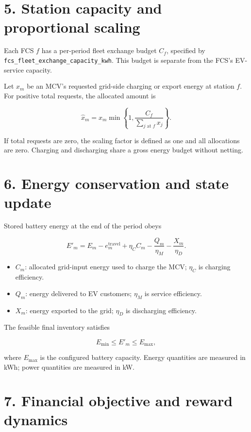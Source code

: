 \documentclass[11pt,letterpaper]{article}
\begin{document}
\section*{5. Station capacity and proportional scaling}


Each FCS $f$ has a per-period fleet exchange budget $C_f$, specified by \texttt{fcs\_fleet\_exchange\_capacity\_kwh}. This budget is separate from the FCS's EV-service capacity.

Let $x_m$ be an MCV's requested grid-side charging or export energy at station $f$. For positive total requests, the allocated amount is

\[
\widehat{x}_m=
x_m\min\left\{
1,\frac{C_f}{\sum_{j\text{ at }f}x_j}
\right\}.
\]


If total requests are zero, the scaling factor is defined as one and all allocations are zero. Charging and discharging share a gross energy budget without netting.

\section*{6. Energy conservation and state update}


Stored battery energy at the end of the period obeys

\[
E'_m=
E_m-e_m^{\mathrm{travel}}
+\eta_C C_m
-\frac{Q_m}{\eta_M}
-\frac{X_m}{\eta_D}.
\]


\begin{itemize}
\setlength{\itemsep}{1pt}
\item $C_m$: allocated grid-input energy used to charge the MCV; $\eta_C$ is charging efficiency.
\item $Q_m$: energy delivered to EV customers; $\eta_M$ is service efficiency.
\item $X_m$: energy exported to the grid; $\eta_D$ is discharging efficiency.
\end{itemize}


The feasible final inventory satisfies

\[
E_{\min}\leq E'_m\leq E_{\max},
\]


where $E_{\max}$ is the configured battery capacity. Energy quantities are measured in kWh; power quantities are measured in kW.

\section*{7. Financial objective and reward dynamics}
\end{document}
